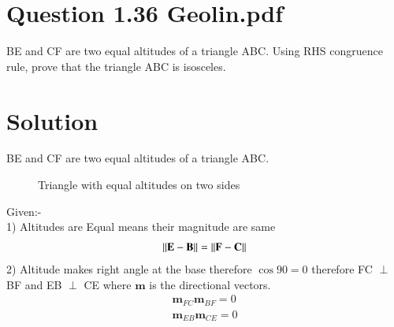 \documentclass[journal,12pt,twocolumn]{IEEEtran}
\begin{document}
\author{}
\maketitle
\section{Question 1.36 Geolin.pdf }
BE and CF are two equal altitudes of a triangle ABC. Using RHS congruence rule, prove that the triangle ABC is isosceles.
\section{Solution}

BE and CF are two equal altitudes of a triangle ABC.
\captionsetup{justification=centering}

\begin{figure}[!h]
\centering
\resizebox{.5\columnwidth}{!}
{
}
\caption{Triangle with equal altitudes on two sides}
\label{myfig}
\end{figure}
Given:-\\
1) Altitudes are Equal means their magnitude are same
 \begin{align}
 	\left\lVert\mathbf{E} - \mathbf{B}\right\rVert = \left\lVert\mathbf{F} - \mathbf{C}\right\rVert \label{1}
 \end{align}
2) Altitude makes right angle at the base therefore $\cos 90 =0$ therefore  FC $\perp$ BF and EB $\perp$ CE where $\textbf{m}$ is the directional vectors.
\begin{align}
\textbf{m}_{FC} \textbf{m}_{BF} = 0 \label{2}\\
\textbf{m}_{EB} \textbf{m}_{CE} = 0 \label{3}
\end{align}
\end{document}
